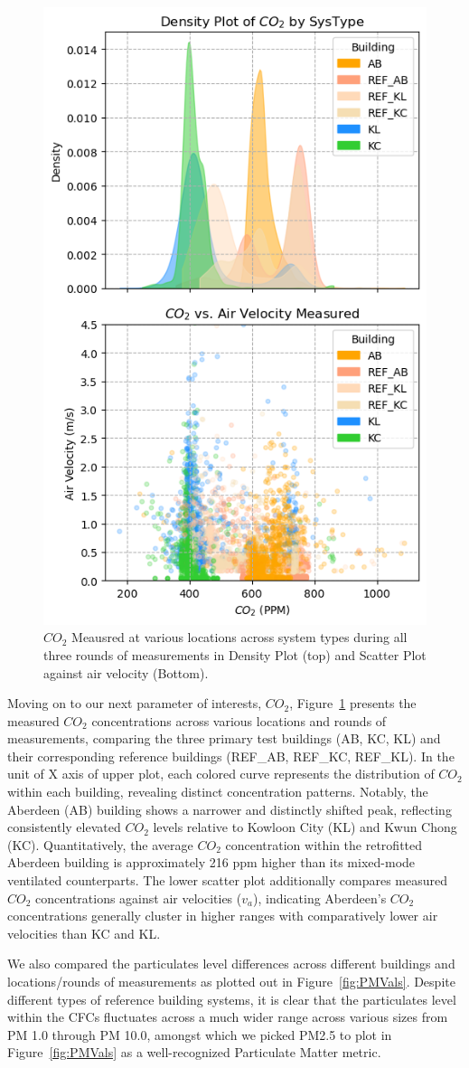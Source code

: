 \documentclass[preprint,12pt]{elsarticle}
\begin{document}
\begin{figure}[h!]
    \centering
    \includegraphics[width=0.5\linewidth]{COST_CO2.png}
    \caption{$CO_2$ Meausred at various locations across system types during all three rounds of measurements in Density Plot (top) and Scatter Plot  against air velocity (Bottom).}
    \label{fig:$CO_2$-types-meas}
\end{figure}


Moving on to our next parameter of interests, $CO_2$, Figure~\ref{fig:$CO_2$-types-meas} presents the measured $CO_2$ concentrations across various locations and rounds of measurements, comparing the three primary test buildings (AB, KC, KL) and their corresponding reference buildings (REF\_AB, REF\_KC, REF\_KL). In the unit of X axis of upper plot, each colored curve represents the distribution of $CO_2$ within each building, revealing distinct concentration patterns. Notably, the Aberdeen (AB) building shows a narrower and distinctly shifted peak, reflecting consistently elevated $CO_2$ levels relative to Kowloon City (KL) and Kwun Chong (KC). Quantitatively, the average $CO_2$ concentration within the retrofitted Aberdeen building is approximately 216 ppm higher than its mixed-mode ventilated counterparts. The lower scatter plot additionally compares measured $CO_2$ concentrations against air velocities ($v_a$), indicating Aberdeen’s $CO_2$ concentrations generally cluster in higher ranges with comparatively lower air velocities than KC and KL.


We also compared the particulates level differences across different buildings and locations/rounds of measurements as plotted out in Figure~\ref{fig:PMVals}. Despite different types of reference building systems, it is clear that the particulates level within the CFCs fluctuates across a much wider range across various sizes from PM 1.0 through PM 10.0, amongst which we picked PM2.5 to plot in Figure~\ref{fig:PMVals} as a well-recognized Particulate Matter metric.
    
\end{document}
